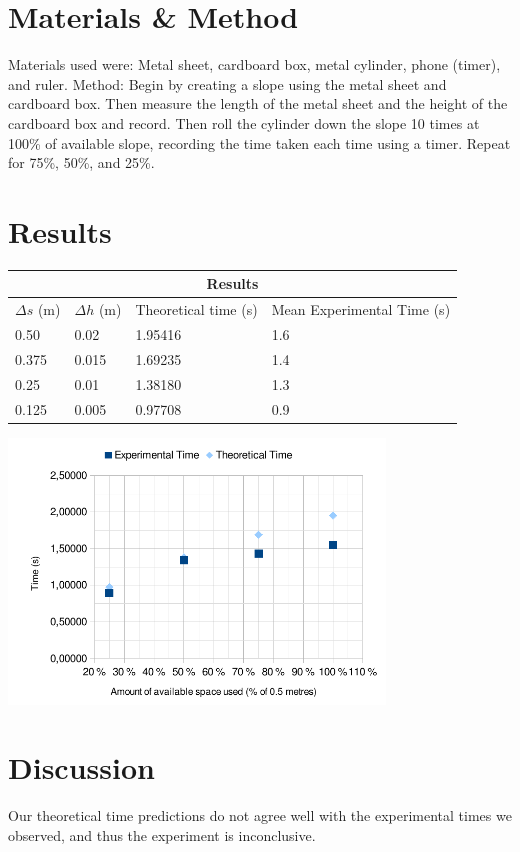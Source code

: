 \documentclass[twoside]{article}
\begin{document}
\section*{Materials \& Method}
Materials used were: Metal sheet, cardboard box, metal cylinder, phone (timer), and ruler. Method: Begin by creating a slope using the metal sheet and cardboard box. Then measure the length of the metal sheet and the height of the cardboard box and record. Then roll the cylinder down the slope 10 times at 100\% of available slope, recording the time taken each time using a timer. Repeat for 75\%, 50\%, and 25\%.

\section*{Results}

\begin{center}
	\begin{tabular}{ |p{3cm}|p{3cm}|p{3cm}|p{3cm}|  }
		\hline
  	  \multicolumn{4}{|c|}{Results} \\
  	\hline
			$\Delta s$ (m) & $\Delta h$ (m) & Theoretical time (s) & Mean Experimental Time (s) \\
 	  \hline
 	    0.50 & 0.02 & 1.95416 & 1.6 \\ \hline
  	  0.375 & 0.015 & 1.69235 & 1.4 \\ \hline
  	  0.25 & 0.01 & 1.38180 & 1.3 \\ \hline
      0.125 & 0.005 & 0.97708 & 0.9 \\ \hline
	\end{tabular}
	\includegraphics[width=10cm]{chart.pdf}
\end{center}

\section*{Discussion}
Our theoretical time predictions do not agree well with the experimental times we observed, and thus the experiment is inconclusive.
\end{document}

